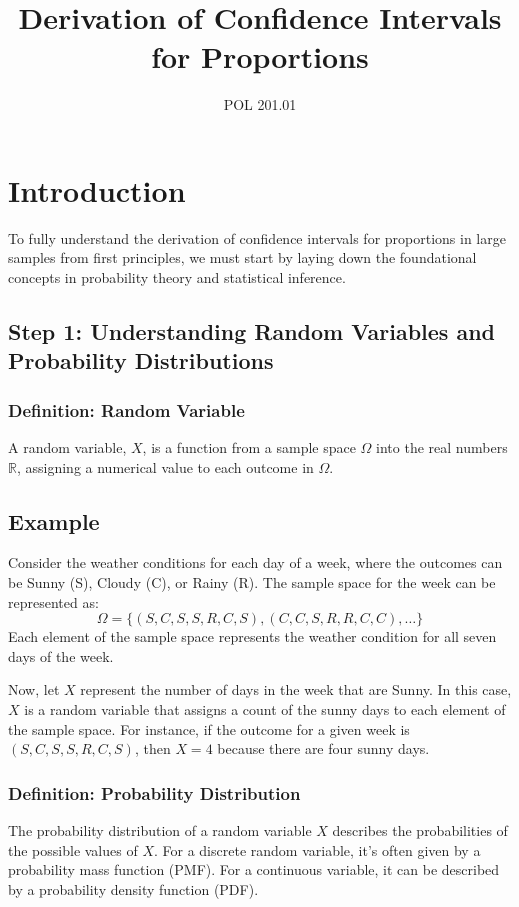 \documentclass[11pt]{article}
\begin{document}
\title{Derivation of Confidence Intervals for Proportions}
\author{POL 201.01}
\date{} %
\maketitle

\section*{Introduction}

To fully understand the derivation of confidence intervals for proportions in large samples from first principles, we must start by laying down the foundational concepts in probability theory and statistical inference.

\subsection*{Step 1: Understanding Random Variables and Probability Distributions}

\subsubsection*{Definition: Random Variable}
A random variable, \(X\), is a function from a sample space \(\Omega\) into the real numbers \(\mathbb{R}\), assigning a numerical value to each outcome in \(\Omega\).

\subsection*{Example}

Consider the weather conditions for each day of a week, where the outcomes can be Sunny (S), Cloudy (C), or Rainy (R). The sample space for the week can be represented as:
\[
\Omega = \{ (S, C, S, S, R, C, S), (C, C, S, R, R, C, C),  \ldots \}
\]
Each element of the sample space represents the weather condition for all seven days of the week.

Now, let \(X\) represent the number of days in the week that are Sunny. In this case, \(X\) is a random variable that assigns a count of the sunny days to each element of the sample space. For instance, if the outcome for a given week is \((S, C, S, S, R, C, S)\), then \(X = 4\) because there are four sunny days.


\subsubsection*{Definition: Probability Distribution}
The probability distribution of a random variable \(X\) describes the probabilities of the possible values of \(X\). For a discrete random variable, it's often given by a probability mass function (PMF). For a continuous variable, it can be described by a probability density function (PDF).
\end{document}
